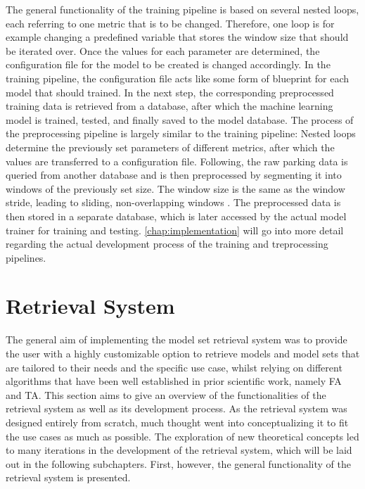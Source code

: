The general functionality of the training pipeline is based on several nested loops, each referring to one metric that is to be changed. Therefore, one loop is for example changing a predefined variable that stores the window size that should be iterated over. Once the values for each parameter are determined, the configuration file for the model to be created is changed accordingly. In the training pipeline, the configuration file acts like some form of blueprint for each model that should trained. In the next step, the corresponding preprocessed training data is retrieved from a database, after which the machine learning model is trained, tested, and finally saved to the model database. The process of the preprocessing pipeline is largely similar to the training pipeline: Nested loops determine the previously set parameters of different metrics, after which the values are transferred to a configuration file. Following, the raw parking data is queried from another database and is then preprocessed by segmenting it into windows of the previously set size. The window size is the same as the window stride, leading to sliding, non-overlapping windows \cite{dehghani2019}. The preprocessed data is then stored in a separate database, which is later accessed by the actual model trainer for training and testing. \autoref{chap:implementation} will go into more detail regarding the actual development process of the training and treprocessing pipelines.

\section{Retrieval System}\label{sec:designretrieval}

The general aim of implementing the model set retrieval system was to provide the user with a highly customizable option to retrieve models and model sets that are tailored to their needs and the specific use case, whilst relying on different algorithms that have been well established in prior scientific work, namely FA and TA. This section aims to give an overview of the functionalities of the retrieval system as well as its development process. As the retrieval system was designed entirely from scratch, much thought went into conceptualizing it to fit the use cases as much as possible. The exploration of new theoretical concepts led to many iterations in the development of the retrieval system, which will be laid out in the following subchapters. First, however, the general functionality of the retrieval system is presented. 

